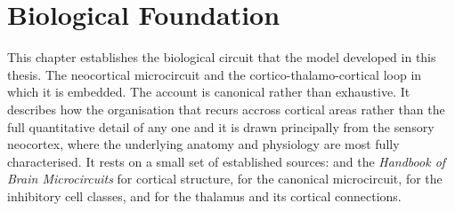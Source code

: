 \chapter{Biological Foundation}
\label{chap:bio}

This chapter establishes the biological circuit that the model developed in this thesis.
The neocortical microcircuit and the cortico-thalamo-cortical loop in which it is embedded. The account is canonical rather than exhaustive.
It describes how the organisation that recurs accross cortical areas rather than the full quantitative detail of any one and it is drawn 
principally from the sensory neocortex, where the underlying anatomy and physiology are most fully characterised.
It rests on a small set of established sources:
\textcite{white1989} and the \emph{Handbook of Brain Microcircuits} \parencite{shepherd2018} for cortical structure, \textcite{douglas1989,douglas2004} for the canonical microcircuit, \textcite{rudy2011} for the inhibitory cell classes, and \textcite{sherman1998,sherman2013} for the thalamus and its cortical connections.

